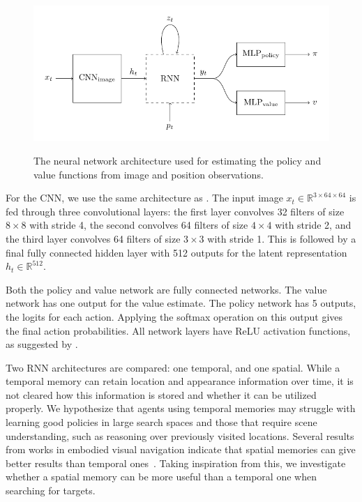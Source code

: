 \begin{figure}
    \centering
    \includegraphics{figures/architecture.pdf}
    \label{fig:architecture}
    \caption[Network architecture]{The neural network architecture used for estimating the policy and value functions from image and position observations.}
\end{figure}

For the CNN, we use the same architecture as \cite{mnih_human_2015}.
The input image \(x_t \in \mathbb{R}^{3 \times 64 \times 64}\) is fed through three convolutional layers: the first layer convolves 32 filters of size \(8 \times 8\) with stride 4, the second convolves 64 filters of size \(4 \times 4\) with stride 2, and the third layer convolves 64 filters of size \(3 \times 3\) with stride 1.
This is followed by a final fully connected hidden layer with 512 outputs for the latent representation \(h_t \in \mathbb{R}^{512}\).

Both the policy and value network are fully connected networks.
The value network has one output for the value estimate.
The policy network has 5 outputs, the logits for each action.
Applying the softmax operation on this output gives the final action probabilities.
All network layers have ReLU activation functions, as suggested by \cite{henderson_matters_2018}.

Two RNN architectures are compared: one temporal, and one spatial.
While a temporal memory can retain location and appearance information over time, it is not cleared how this information is stored and whether it can be utilized properly.
We hypothesize that agents using temporal memories may struggle with learning good policies in large search spaces and those that require scene understanding, such as reasoning over previously visited locations.
Several results from works in embodied visual navigation indicate that spatial memories can give better results than temporal ones~\cite{parisotto_salakhutdinov_2017,henriques_vedaldi_2018,gupta_cognitive_2019,chaplot_semantic_2020}.
Taking inspiration from this, we investigate whether a spatial memory can be more useful than a temporal one when searching for targets.


